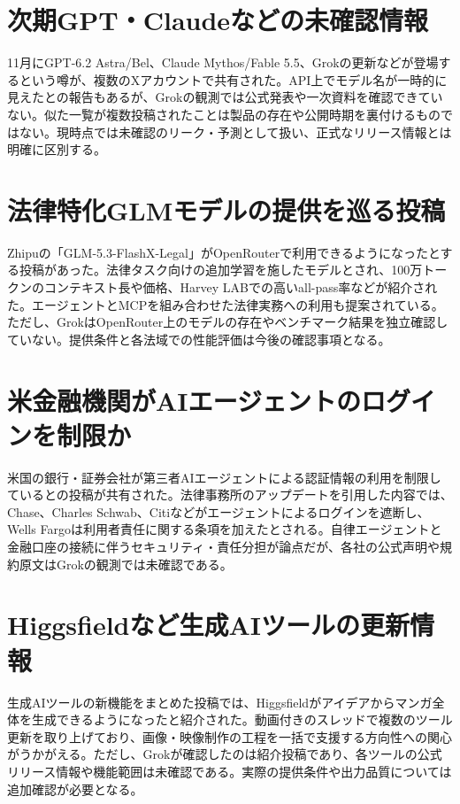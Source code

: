 \section{次期GPT・Claudeなどの未確認情報}
11月にGPT-6.2 Astra/Bel、Claude Mythos/Fable 5.5、Grokの更新などが登場するという噂が、複数のXアカウントで共有された。API上でモデル名が一時的に見えたとの報告もあるが、Grokの観測では公式発表や一次資料を確認できていない。似た一覧が複数投稿されたことは製品の存在や公開時期を裏付けるものではない。現時点では未確認のリーク・予測として扱い、正式なリリース情報とは明確に区別する。

\section{法律特化GLMモデルの提供を巡る投稿}
Zhipuの「GLM-5.3-FlashX-Legal」がOpenRouterで利用できるようになったとする投稿があった。法律タスク向けの追加学習を施したモデルとされ、100万トークンのコンテキスト長や価格、Harvey LABでの高いall-pass率などが紹介された。エージェントとMCPを組み合わせた法律実務への利用も提案されている。ただし、GrokはOpenRouter上のモデルの存在やベンチマーク結果を独立確認していない。提供条件と各法域での性能評価は今後の確認事項となる。

\section{米金融機関がAIエージェントのログインを制限か}
米国の銀行・証券会社が第三者AIエージェントによる認証情報の利用を制限しているとの投稿が共有された。法律事務所のアップデートを引用した内容では、Chase、Charles Schwab、Citiなどがエージェントによるログインを遮断し、Wells Fargoは利用者責任に関する条項を加えたとされる。自律エージェントと金融口座の接続に伴うセキュリティ・責任分担が論点だが、各社の公式声明や規約原文はGrokの観測では未確認である。

\section{Higgsfieldなど生成AIツールの更新情報}
生成AIツールの新機能をまとめた投稿では、Higgsfieldがアイデアからマンガ全体を生成できるようになったと紹介された。動画付きのスレッドで複数のツール更新を取り上げており、画像・映像制作の工程を一括で支援する方向性への関心がうかがえる。ただし、Grokが確認したのは紹介投稿であり、各ツールの公式リリース情報や機能範囲は未確認である。実際の提供条件や出力品質については追加確認が必要となる。
